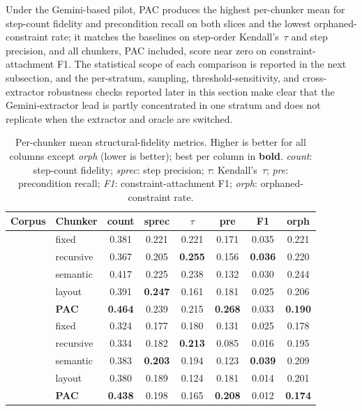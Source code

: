 \documentclass[fleqn,10pt]{wlscirep}
\begin{document}
Under the Gemini-based pilot, PAC produces the highest per-chunker
mean for step-count fidelity and precondition recall on both slices
and the lowest orphaned-constraint rate; it matches the baselines on
step-order Kendall's~$\tau$ and step precision, and all chunkers, PAC
included, score near zero on constraint-attachment F1. The
statistical scope of each comparison is reported in the next
subsection, and the per-stratum, sampling, threshold-sensitivity, and
cross-extractor robustness checks reported later in this section make
clear that the Gemini-extractor lead is partly concentrated in one
stratum and does not replicate when the extractor and oracle are
switched.

\begin{table}[ht]
\centering
\caption{Per-chunker mean structural-fidelity metrics. Higher is better
for all columns except \emph{orph} (lower is better); best per column in
\textbf{bold}. \emph{count}: step-count fidelity; \emph{sprec}: step
precision; $\tau$: Kendall's~$\tau$; \emph{pre}: precondition recall;
\emph{F1}: constraint-attachment F1; \emph{orph}: orphaned-constraint
rate.}
\label{tab:headline}
\begin{tabular}{llcccccc}
\toprule
Corpus & Chunker & count & sprec & $\tau$ & pre & F1 & orph \\
\midrule
{}
 & fixed        & 0.381 & 0.221 & 0.221 & 0.171 & 0.035 & 0.221 \\
 & recursive    & 0.367 & 0.205 & \textbf{0.255} & 0.156 & \textbf{0.036} & 0.220 \\
 & semantic     & 0.417 & 0.225 & 0.238 & 0.132 & 0.030 & 0.244 \\
 & layout       & 0.391 & \textbf{0.247} & 0.161 & 0.181 & 0.025 & 0.206 \\
 & \textbf{PAC} & \textbf{0.464} & 0.239 & 0.215 & \textbf{0.268} & 0.033 & \textbf{0.190} \\
\midrule
{}
 & fixed        & 0.324 & 0.177 & 0.180 & 0.131 & 0.025 & 0.178 \\
 & recursive    & 0.334 & 0.182 & \textbf{0.213} & 0.085 & 0.016 & 0.195 \\
 & semantic     & 0.383 & \textbf{0.203} & 0.194 & 0.123 & \textbf{0.039} & 0.209 \\
 & layout       & 0.380 & 0.189 & 0.124 & 0.181 & 0.014 & 0.201 \\
 & \textbf{PAC} & \textbf{0.438} & 0.198 & 0.165 & \textbf{0.208} & 0.012 & \textbf{0.174} \\
\bottomrule
\end{tabular}
\end{table}
\end{document}
